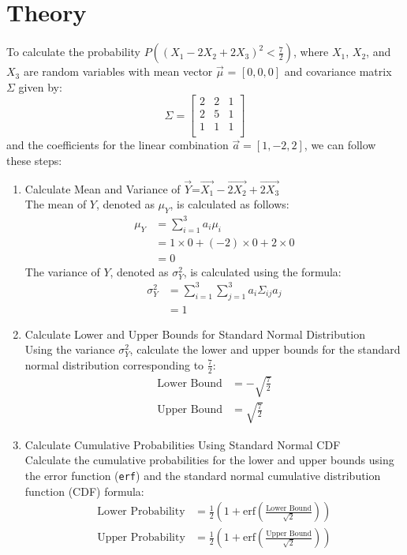 \documentclass[journal,12pt,twocolumn]{IEEEtran}
\begin{document}
\section{Theory}
To calculate the probability $P((X_1 - 2X_2 + 2X_3)^2 < \frac{7}{2})$, where $X_1$, $X_2$, and $X_3$ are random variables with mean vector $\vec{\mu}$ = $[0, 0, 0]$ and covariance matrix $\Sigma$ given by:
\[
\Sigma = \begin{bmatrix}
2 & 2 & 1 \\
2 & 5 & 1 \\
1 & 1 & 1 \\
\end{bmatrix}
\]
and the coefficients for the linear combination $\vec{a} = [1, -2, 2]$, we can follow these steps:

\begin{enumerate}
    \item Calculate Mean and Variance of $\vec{Y}$=$\vec{X_1}-\vec{2X_2}+\vec{2X_3}$  \\
    The mean of $Y$, denoted as $\mu_Y$, is calculated as follows:
    \begin{align}
    \mu_Y &= \sum_{i=1}^{3} a_i \mu_i \\
    &= 1 \times 0 + (-2) \times 0 + 2 \times 0 \\
    &= 0
    \end{align}
    The variance of $Y$, denoted as $\sigma_Y^2$, is calculated using the formula:
    \begin{align}
    \sigma_Y^2 &= \sum_{i=1}^{3} \sum_{j=1}^{3} a_i \Sigma_{ij} a_j \\
    &= 1
    \end{align}
    
    \item Calculate Lower and Upper Bounds for Standard Normal Distribution \\
    Using the variance $\sigma_Y^2$, calculate the lower and upper bounds for the standard normal distribution corresponding to $\frac{7}{2}$:
    \begin{align}
    \text{Lower Bound} &= -\sqrt{\frac{7}{2}} \\
    \text{Upper Bound} &= \sqrt{\frac{7}{2}}
    \end{align}
    
    \item Calculate Cumulative Probabilities Using Standard Normal CDF \\
    Calculate the cumulative probabilities for the lower and upper bounds using the error function (\texttt{erf}) and the standard normal cumulative distribution function (CDF) formula:
    \begin{align}
    \text{Lower Probability} &= \frac{1}{2} \left(1 + \text{erf}\left(\frac{\text{Lower Bound}}{\sqrt{2}}\right)\right) \\
    \text{Upper Probability} &= \frac{1}{2} \left(1 + \text{erf}\left(\frac{\text{Upper Bound}}{\sqrt{2}}\right)\right)
    \end{align}
    

\end{enumerate}
\end{document}
